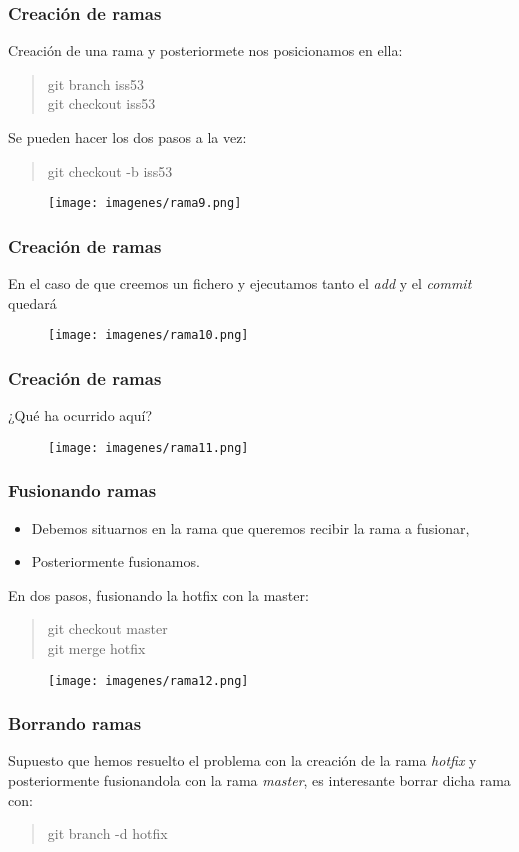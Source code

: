 \documentclass{beamer}
\begin{document}
\begin{frame}
\frametitle{Creación de ramas}
Creación de una rama y posteriormete nos posicionamos en ella:
\begin{verse}
git branch iss53\\
git checkout iss53
\end{verse}
\pause
Se pueden hacer los dos pasos a la vez:
\begin{verse}
git checkout -b iss53
\end{verse}
\begin{figure}
\texttt{[image: imagenes/rama9.png]}
\end{figure}
\end{frame}

\begin{frame}
\frametitle{Creación de ramas}
En el caso de que creemos un fichero y ejecutamos tanto el \emph{add} y el \emph{commit} quedará
\begin{figure}
\texttt{[image: imagenes/rama10.png]}
\end{figure}
\end{frame}




\begin{frame}
\frametitle{Creación de ramas}
¿Qué ha ocurrido aquí?
\begin{figure}
\texttt{[image: imagenes/rama11.png]}
\end{figure}
\end{frame}


\begin{frame}
\frametitle{Fusionando ramas}
\begin{itemize}[<+->]
\item Debemos situarnos en la rama que queremos recibir la rama a fusionar,
\item Posteriormente fusionamos.
\end{itemize}
\pause
En dos pasos, fusionando la hotfix con la master:
\begin{verse}
git checkout master\\
git merge hotfix
\end{verse}
\begin{figure}
\texttt{[image: imagenes/rama12.png]}
\end{figure}
\end{frame}

\begin{frame}
\frametitle{Borrando ramas}
Supuesto que hemos resuelto el problema con la creación de la rama \emph{hotfix} y posteriormente fusionandola con la rama \emph{master}, es interesante borrar dicha rama con:
\pause
\begin{verse}
git branch -d hotfix
\end{verse}
\end{frame}
\end{document}
